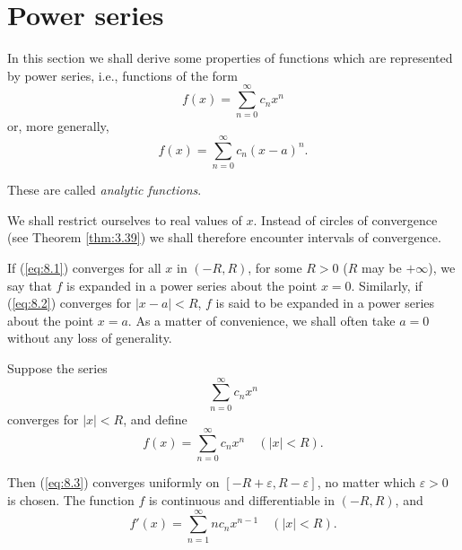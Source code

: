 \section{Power series}
In this section we shall derive some properties of functions which are represented by power series, i.e., functions of the form
\begin{equation}
    \label{eq:8.1}
    f(x) = \sum_{n=0}^{\infty} c_n x^n
\end{equation}
or, more generally,
\begin{equation}
    \label{eq:8.2}
    f(x) = \sum_{n=0}^{\infty} c_n (x - a)^n.
\end{equation}

These are called \emph{analytic functions}.

We shall restrict ourselves to real values of $x$. 
Instead of circles of convergence (see Theorem \ref{thm:3.39}) 
we shall therefore encounter intervals of convergence.

If (\ref{eq:8.1}) converges for all $x$ in $(-R, R)$, 
for some $R > 0$ ($R$ may be $+ \infty$),
we say that $f$ is expanded in a power series about the point $x = 0$. 
Similarly, if (\ref{eq:8.2}) converges for $\left| x - a \right|  < R$, 
$f$ is said to be expanded in a power series about the point $x = a$. 
As a matter of convenience, we shall often take $a = 0$ without
any loss of generality.

\begin{thm}
    \label{thm:8.1}
    Suppose the series
    \begin{equation}
        \label{eq:8.3}
        \sum_{n=0}^{\infty} c_n x^n
    \end{equation}
    converges for $\left| x \right| < R$, and define
    \begin{equation}
        \label{eq:8.4}
        f(x) = 
        \sum_{n=0}^{\infty} c_n x^n
        \quad 
        (\left| x \right| < R).
    \end{equation}

    Then (\ref{eq:8.3}) converges uniformly on $[-R+\varepsilon, R-\varepsilon]$, no matter which $\varepsilon > 0$ is chosen. 
    The function $f$ is continuous and differentiable in $(-R, R)$, and
    \begin{equation}
        \label{eq:8.5}
        f'(x) = 
        \sum_{n=1}^{\infty} n c_n x^{n-1}
        \quad 
        (\left| x \right| < R).
    \end{equation}
\end{thm}

